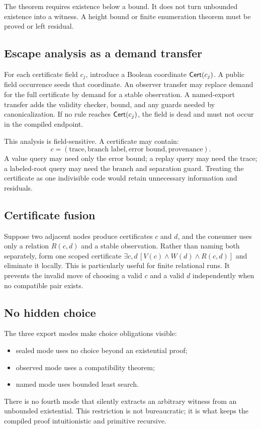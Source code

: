 The theorem requires existence below a bound.  It does not turn unbounded
existence into a witness.  A height bound or finite enumeration theorem must be
proved or left residual.

\subsection{Escape analysis as a demand transfer}

For each certificate field \(c_j\), introduce a Boolean coordinate
\(\mathsf{Cert}(c_j)\).  A public field occurrence seeds that coordinate.  An observer
transfer may replace demand for the full certificate by demand for a stable
observation.  A named-export transfer adds the validity checker, bound, and any
guards needed by canonicalization.  If no rule reaches \(\mathsf{Cert}(c_j)\), the
field is dead and must not occur in the compiled endpoint.

This analysis is field-sensitive.  A certificate may contain:
\[
  c=(\text{trace},\text{branch label},\text{error bound},\text{provenance}).
\]
A value query may need only the error bound; a replay query may need the trace;
a labeled-root query may need the branch and separation guard.  Treating the
certificate as one indivisible code would retain unnecessary information and
residuals.

\subsection{Certificate fusion}

Suppose two adjacent nodes produce certificates \(c\) and \(d\), and the
consumer uses only a relation \(R(c,d)\) and a stable observation.  Rather than
naming both separately, form one scoped certificate
\(\exists c,d\,[V(c)\wedge W(d)\wedge R(c,d)]\) and eliminate it locally.
This is particularly useful for finite relational runs.  It prevents the
invalid move of choosing a valid \(c\) and a valid \(d\) independently when no
compatible pair exists.

\subsection{No hidden choice}

The three export modes make choice obligations visible:
\begin{itemize}
  \item sealed mode uses no choice beyond an existential proof;
  \item observed mode uses a compatibility theorem;
  \item named mode uses bounded least search.
\end{itemize}
There is no fourth mode that silently extracts an arbitrary witness from an
unbounded existential.  This restriction is not bureaucratic; it is what keeps
the compiled proof intuitionistic and primitive recursive.
